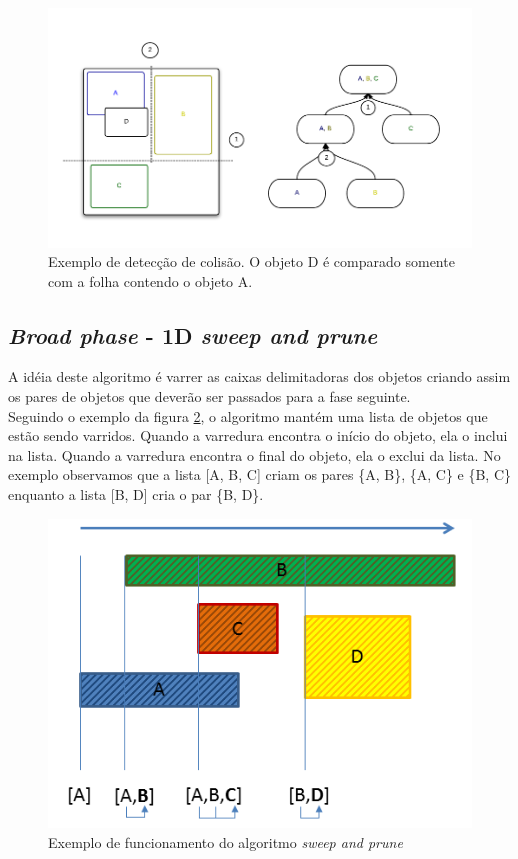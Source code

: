 \begin{figure}[H]
  \includegraphics[scale=0.4]{AABBTree1.png}
  \caption{Exemplo de detecção de colisão. O objeto D é comparado somente com a folha contendo o objeto A.}
  \label{aabbTree}
\end{figure}

\subsection{\textit{Broad phase} - 1D \textit{sweep and prune}}

A idéia deste algoritmo é varrer as caixas delimitadoras dos objetos criando assim os pares de objetos que deverão ser passados para a fase seguinte. \\

Seguindo o exemplo da figura \ref{sweep}, o algoritmo mantém uma lista de objetos que estão sendo varridos. Quando a varredura encontra o início do objeto, ela o inclui na lista. 
Quando a varredura encontra o final do objeto, ela o exclui da lista. No exemplo observamos que a lista [A, B, C] criam os pares \{A, B\}, \{A, C\} e \{B, C\} 
enquanto a lista [B, D] cria o par \{B, D\}. \\

\begin{figure}[!htbp]
  \centering
  \includegraphics[scale=0.7]{sp.png}
  \caption{Exemplo de funcionamento do algoritmo \textit{sweep and prune}}
  \label{sweep}
\end{figure}

